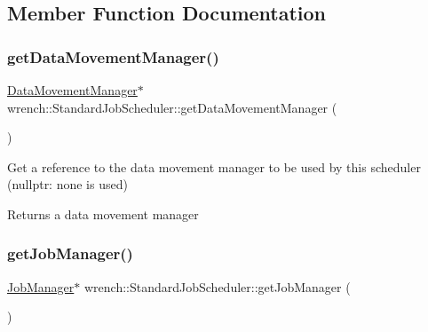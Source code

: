 \subsection{Member Function Documentation}
\mbox{\label{classwrench_1_1_standard_job_scheduler_af570fb0bd50992704a8546d33e644a22}} 
\subsubsection{\texorpdfstring{get\+Data\+Movement\+Manager()}{getDataMovementManager()}}
{\footnotesize\ttfamily \hyperlink{classwrench_1_1_data_movement_manager}{Data\+Movement\+Manager}$\ast$ wrench\+::\+Standard\+Job\+Scheduler\+::get\+Data\+Movement\+Manager (\begin{DoxyParamCaption}{ }\end{DoxyParamCaption})\hspace{0.3cm}{\ttfamily [inline]}}



Get a reference to the data movement manager to be used by this scheduler (nullptr\+: none is used) 

\begin{DoxyReturn}{Returns}
a data movement manager 
\end{DoxyReturn}
\mbox{\label{classwrench_1_1_standard_job_scheduler_a95d72ffb0b6609899bdca37b230c5f8b}} 
\subsubsection{\texorpdfstring{get\+Job\+Manager()}{getJobManager()}}
{\footnotesize\ttfamily \hyperlink{classwrench_1_1_job_manager}{Job\+Manager}$\ast$ wrench\+::\+Standard\+Job\+Scheduler\+::get\+Job\+Manager (\begin{DoxyParamCaption}{ }\end{DoxyParamCaption})\hspace{0.3cm}{\ttfamily [inline]}}



